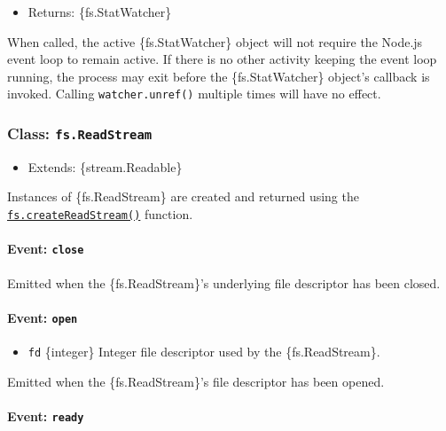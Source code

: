 \begin{itemize}
\tightlist
\item
  Returns: \{fs.StatWatcher\}
\end{itemize}

When called, the active \{fs.StatWatcher\} object will not require the
Node.js event loop to remain active. If there is no other activity
keeping the event loop running, the process may exit before the
\{fs.StatWatcher\} object's callback is invoked. Calling
\texttt{watcher.unref()} multiple times will have no effect.

\subsubsection{\texorpdfstring{Class:
\texttt{fs.ReadStream}}{Class: fs.ReadStream}}\label{class-fs.readstream}

\begin{itemize}
\tightlist
\item
  Extends: \{stream.Readable\}
\end{itemize}

Instances of \{fs.ReadStream\} are created and returned using the
\hyperref[fscreatereadstreampath-options]{\texttt{fs.createReadStream()}}
function.

\paragraph{\texorpdfstring{Event:
\texttt{\textquotesingle{}close\textquotesingle{}}}{Event: \textquotesingle close\textquotesingle{}}}\label{event-close-2}

Emitted when the \{fs.ReadStream\}'s underlying file descriptor has been
closed.

\paragraph{\texorpdfstring{Event:
\texttt{\textquotesingle{}open\textquotesingle{}}}{Event: \textquotesingle open\textquotesingle{}}}\label{event-open}

\begin{itemize}
\tightlist
\item
  \texttt{fd} \{integer\} Integer file descriptor used by the
  \{fs.ReadStream\}.
\end{itemize}

Emitted when the \{fs.ReadStream\}'s file descriptor has been opened.

\paragraph{\texorpdfstring{Event:
\texttt{\textquotesingle{}ready\textquotesingle{}}}{Event: \textquotesingle ready\textquotesingle{}}}\label{event-ready}

